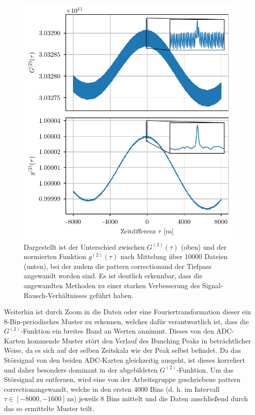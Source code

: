 \begin{figure}[h]
    \centering
    \includegraphics{images/Datenaufnahme/G2_vs_g2.pdf}
    \caption{Dargestellt ist der Unterschied zwischen $G^{(2)}(\tau)$ (oben) und der normierten Funktion $g^{(2)}(\tau)$ nach Mittelung über 10000 Dateien (unten), bei der zudem die \glqq pattern correction\grqq\;und der Tiefpass angewandt worden sind. Es ist deutlich erkennbar, dass die angewandten Methoden zu einer starken Verbesserung des Signal-Rausch-Verhältnisses geführt haben. }
    \label{fig:gemittelte G2 vs g2}
\end{figure}
Weiterhin ist durch Zoom in die Daten oder eine Fouriertransformation dieser ein 8-Bin-periodisches Muster zu erkennen, welches dafür verantwortlich ist, dass die $G^{(2)}$-Funktion ein breites Band an Werten annimmt. 
Dieses von den ADC-Karten kommende Muster stört den Verlauf des Bunching Peaks in beträchtlicher Weise, da es sich auf der selben Zeitskala wie der Peak selbst befindet. 
Da das Störsignal von den beiden ADC-Karten gleichzeitig ausgeht, ist dieses korreliert und daher besonders dominant in der abgebildeten $G^{(2)}$-Funktion.
Um das Störsignal zu entfernen, wird eine von der Arbeitsgruppe geschriebene \glqq pattern correction\grqq\;angewandt, welche in den ersten 4000 Bins (d. h. im Intervall $\tau\in[-8000,-1600]\,\mathrm{ns}$) jeweils 8 Bins mittelt und die Daten anschließend durch das so ermittelte Muster teilt. 

